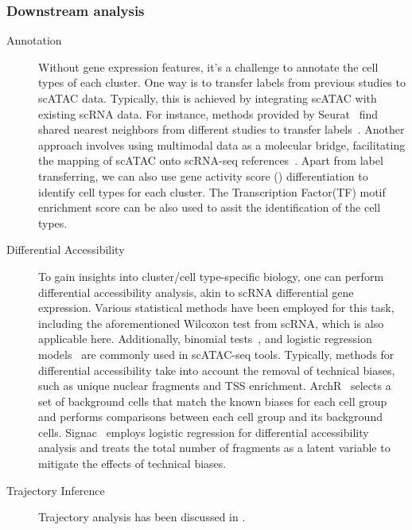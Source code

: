 \subsubsection{Downstream analysis}
\label{background:sec2:atac_downstream}
\begin{description}

	\item[Annotation]
	Without gene expression features, it's a challenge to annotate the cell types of each cluster. One way is to transfer labels from previous studies to scATAC data. Typically, this is achieved by integrating scATAC with existing scRNA data. For instance, methods provided by Seurat~\citep{stuart2019seurat3} find shared nearest neighbors from different studies to transfer labels~\citep{stuart2019seurat3}. Another approach involves using multimodal data as a molecular bridge, facilitating the mapping of scATAC onto scRNA-seq references~\citep{hao2023dictionary}. Apart from label transferring, we can also use gene activity score () differentiation to identify cell types for each cluster. The Transcription Factor(TF) motif enrichment score can be also used to assit the identification of the cell types.

	\item[Differential Accessibility]
	To gain insights into cluster/cell type-specific biology, one can perform differential accessibility analysis, akin to scRNA differential gene expression. Various statistical methods have been employed for this task, including the aforementioned Wilcoxon test from scRNA, which is also applicable here. Additionally, binomial tests~\citep{cusanovich2018single}, and logistic regression models~\citep{hao2021seurat4} are commonly used in scATAC-seq tools. Typically, methods for differential accessibility take into account the removal of technical biases, such as unique nuclear fragments and TSS enrichment. ArchR~\citep{Granja2021} selects a set of background cells that match the known biases for each cell group and performs comparisons between each cell group and its background cells. Signac~\citep{hao2021seurat4} employs logistic regression for differential accessibility analysis and treats the total number of fragments as a latent variable to mitigate the effects of technical biases.

	\item[Trajectory Inference]
	Trajectory analysis has been discussed in .



\end{description}
